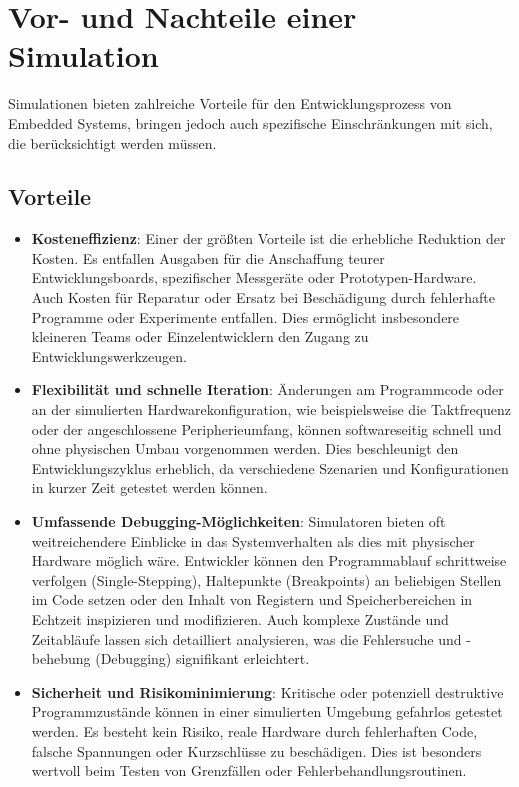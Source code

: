 \section{Vor- und Nachteile einer Simulation}

Simulationen bieten zahlreiche Vorteile für den Entwicklungsprozess von Embedded Systems, bringen jedoch auch spezifische Einschränkungen mit sich, die berücksichtigt werden müssen.

\subsection*{Vorteile}
\begin{itemize}
    \item \textbf{Kosteneffizienz}: Einer der größten Vorteile ist die erhebliche Reduktion der Kosten. Es entfallen Ausgaben für die Anschaffung teurer Entwicklungsboards, spezifischer Messgeräte oder Prototypen-Hardware. Auch Kosten für Reparatur oder Ersatz bei Beschädigung durch fehlerhafte Programme oder Experimente entfallen. Dies ermöglicht insbesondere kleineren Teams oder Einzelentwicklern den Zugang zu Entwicklungswerkzeugen.
    \item \textbf{Flexibilität und schnelle Iteration}: Änderungen am Programmcode oder an der simulierten Hardwarekonfiguration, wie beispielsweise die Taktfrequenz oder der angeschlossene Peripherieumfang, können softwareseitig schnell und ohne physischen Umbau vorgenommen werden. Dies beschleunigt den Entwicklungszyklus erheblich, da verschiedene Szenarien und Konfigurationen in kurzer Zeit getestet werden können.
    \item \textbf{Umfassende Debugging-Möglichkeiten}: Simulatoren bieten oft weitreichendere Einblicke in das Systemverhalten als dies mit physischer Hardware möglich wäre. Entwickler können den Programmablauf schrittweise verfolgen (Single-Stepping), Haltepunkte (Breakpoints) an beliebigen Stellen im Code setzen oder den Inhalt von Registern und Speicherbereichen in Echtzeit inspizieren und modifizieren. Auch komplexe Zustände und Zeitabläufe lassen sich detailliert analysieren, was die Fehlersuche und -behebung (Debugging) signifikant erleichtert.
    \item \textbf{Sicherheit und Risikominimierung}: Kritische oder potenziell destruktive Programmzustände können in einer simulierten Umgebung gefahrlos getestet werden. Es besteht kein Risiko, reale Hardware durch fehlerhaften Code, falsche Spannungen oder Kurzschlüsse zu beschädigen. Dies ist besonders wertvoll beim Testen von Grenzfällen oder Fehlerbehandlungsroutinen.

\end{itemize}

